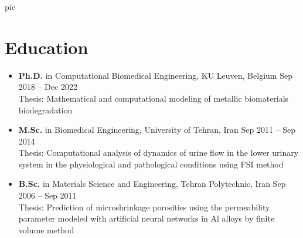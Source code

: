 \documentclass{cv}
\begin{document}
{{pic}}






\section{Education}

\begin{itemize}[itemsep=-0.2ex]
\item
\textbf{Ph.D.} in Computational Biomedical Engineering, KU Leuven, Belgium \hfill Sep 2018 -- Dec 2022
\\
Thesis: Mathematical and computational modeling of metallic biomaterials biodegradation 

\item
\textbf{M.Sc.} in Biomedical Engineering, University of Tehran, Iran \hfill Sep 2011 -- Sep 2014
\\
Thesis: Computational analysis of dynamics of urine flow in the lower urinary system in the physiological and pathological conditions using FSI method 


\item
\textbf{B.Sc.} in Materials Science and Engineering, Tehran Polytechnic, Iran \hfill Sep 2006 -- Sep 2011
\\
Thesis: Prediction of microshrinkage porosities using the permeability parameter modeled with artificial neural networks in Al alloys by finite volume method 

\end{itemize}
\end{document}
